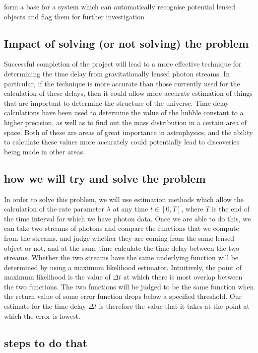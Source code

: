 \documentclass[a4paper,12pt]{article}
\begin{document}
form a base for a system which can automatically recognise potential
lensed objects and flag them for further investigation
\subsection{Impact of solving (or not solving) the problem}
\label{sec-1-2}

   Successful completion of the project will lead to a more effective
   technique for determining the time delay from gravitationally
   lensed photon streams. In particular, if the technique is more
   accurate than those currently used for the calculation of these
   delays, then it could allow more accurate estimation of things that
   are important to determine the structure of the universe. Time
   delay calculations have been used to determine the value of the
   hubble constant to a higher precision, as well as to find out the
   mass distribution in a certain area of space. Both of these are
   areas of great importance in astrophysics, and the ability to
   calculate these values more accurately could potentially lead to
   discoveries being made in other areas.
\subsection{how we will try and solve the problem}
\label{sec-1-3}

   In order to solve this problem, we will use estimation methods
   which allow the calculation of the rate parameter $\lambda$ at any
   time $t \in[0,T]$, where $T$ is the end of the time interval for
   which we have photon data. Once we are able to do this, we can take
   two streams of photons and compare the functions that we compute
   from the streams, and judge whether they are coming from the same
   lensed object or not, and at the same time calculate the time delay
   between the two streams. Whether the two streams have the same
   underlying function will be determined by using a maximum
   likelihood estimator. Intuitively, the point of maximum likelihood
   is the value of $\Delta t$ at which there is most overlap between
   the two functions. The two functions will be judged to be the same
   function when the return value of some error function drops below a
   specified threshold. Our estimate for the time delay $\Delta t$ is
   therefore the value that it takes at the point at which the error
   is lowest.
\subsection{steps to do that}
\label{sec-1-4}
\end{document}
